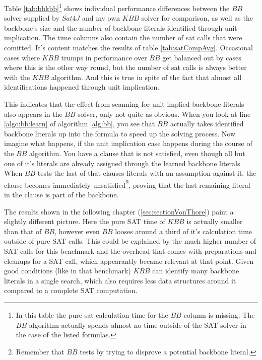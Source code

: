 Table \ref{tab:bbkbb}\footnote{In this table the pure sat calculation time for the $BB$ column is missing. The $BB$ algorithm actually spends almost no time outside of the SAT solver in the case of the listed formulas.
	} 
shows individual performance differences between the $BB$ solver supplied by $Sat4J$ and my own $KBB$ solver for comparison, as well as the backbone's size and the number of backbone literals identified through unit implication. The time columns also contain the number of sat calls that were comitted. It's content matches the results of table \ref{tab:satCompAvg}. Occasional cases where $KBB$ trumps in performance over $BB$ get balanced out by cases where this is the other way round, but the number of sat calls is always better with the $KBB$ algorithm. And this is true in spite of the fact that almost all identifications happened through unit implication. 

This indicates that the effect from scanning for unit implied backbone literals also appears in the $BB$ solver, only not quite as obvious. When you look at line \ref{algo:bb:learn} of algorithm \ref{alg:bb}, you see that $BB$ actually takes identified backbone literals up into the formula to speed up the solving process. Now imagine what happens, if the unit implication case happens during the course of the $BB$ algorithm. You have a clause that is not satisfied, even though all but one of it's literals are already assigned through the learned backbone literals. When $BB$ tests the last of that clauses literals with an assumption against it, the clause becomes immediately unsatisfied\footnote{Remember that $BB$ tests by trying to disprove a potential backbone literal.}, proving that the last remaining literal in the clause is part of the backbone. 

The results shown in the following chapter (\ref{sec:sectionVonThore}) paint a slightly different picture. Here the pure SAT time of $KBB$ is actually smaller than that of $BB$, however even $BB$ looses around a third of it's calculation time outside of pure SAT calls. This could be explained by the much higher number of SAT calls for this benchmark and the overhead that comes with preparations and cleanups for a SAT call, which appearantly became relevant at that point. Given good conditions (like in that benchmark) $KBB$ can identify many backbone literals in a single search, which also requires less data structures around it compared to a complete SAT computation.

